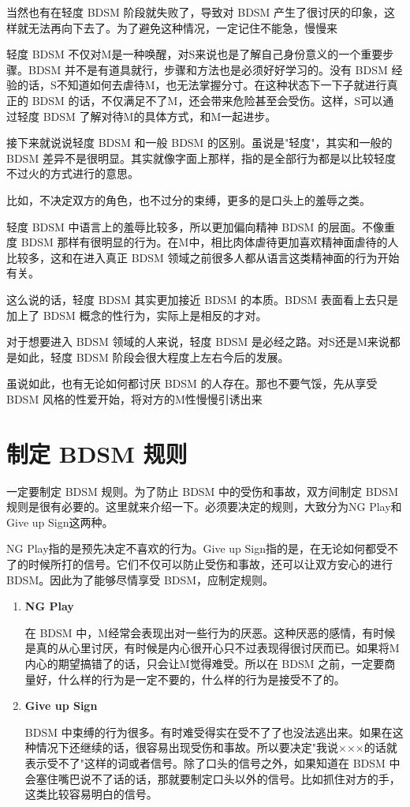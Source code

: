 \documentclass[12pt,UTF8]{ctexbook}
\begin{document}
当然也有在轻度 BDSM 阶段就失败了，导致对 BDSM 产生了很讨厌的印象，这样就无法再向下去了。为了避免这种情况，一定记住不能急，慢慢来~

轻度 BDSM 不仅对M是一种唤醒，对S来说也是了解自己身份意义的一个重要步骤。BDSM 并不是有道具就行，步骤和方法也是必须好好学习的。没有 BDSM 经验的话，S不知道如何去虐待M，也无法掌握分寸。在这种状态下一下子就进行真正的 BDSM 的话，不仅满足不了M，还会带来危险甚至会受伤。这样，S可以通过轻度 BDSM 了解对待M的具体方式，和M一起进步。

接下来就说说轻度 BDSM 和一般 BDSM 的区别。虽说是"轻度"，其实和一般的 BDSM 差异不是很明显。其实就像字面上那样，指的是全部行为都是以比较轻度不过火的方式进行的意思。

比如，不决定双方的角色，也不过分的束缚，更多的是口头上的羞辱之类。

轻度 BDSM 中语言上的羞辱比较多，所以更加偏向精神 BDSM 的层面。不像重度 BDSM 那样有很明显的行为。在M中，相比肉体虐待更加喜欢精神面虐待的人比较多，这和在进入真正 BDSM 领域之前很多人都从语言这类精神面的行为开始有关。

这么说的话，轻度 BDSM 其实更加接近 BDSM 的本质。BDSM 表面看上去只是加上了 BDSM 概念的性行为，实际上是相反的才对。

对于想要进入 BDSM 领域的人来说，轻度 BDSM 是必经之路。对S还是M来说都是如此，轻度 BDSM 阶段会很大程度上左右今后的发展。

虽说如此，也有无论如何都讨厌 BDSM 的人存在。那也不要气馁，先从享受 BDSM 风格的性爱开始，将对方的M性慢慢引诱出来~

\section{制定 BDSM 规则}

一定要制定 BDSM 规则。为了防止 BDSM 中的受伤和事故，双方间制定 BDSM 规则是很有必要的。这里就来介绍一下。必须要决定的规则，大致分为NG Play和Give up Sign这两种。

NG Play指的是预先决定不喜欢的行为。Give up Sign指的是，在无论如何都受不了的时候所打的信号。它们不仅可以防止受伤和事故，还可以让双方安心的进行 BDSM。因此为了能够尽情享受 BDSM，应制定规则。

\begin{enumerate}
	\item \textbf{NG Play}

	在 BDSM 中，M经常会表现出对一些行为的厌恶。这种厌恶的感情，有时候是真的从心里讨厌，有时候是内心很开心只不过表现得很讨厌而已。如果将M内心的期望搞错了的话，只会让M觉得难受。所以在 BDSM 之前，一定要商量好，什么样的行为是一定不要的，什么样的行为是接受不了的。

	\item \textbf{Give up Sign}

	BDSM 中束缚的行为很多。有时难受得实在受不了了也没法逃出来。如果在这种情况下还继续的话，很容易出现受伤和事故。所以要决定"我说×××的话就表示受不了"这样的词或者信号。除了口头的信号之外，如果知道在 BDSM 中会塞住嘴巴说不了话的话，那就要制定口头以外的信号。比如抓住对方的手，这类比较容易明白的信号。
\end{enumerate}
\end{document}
